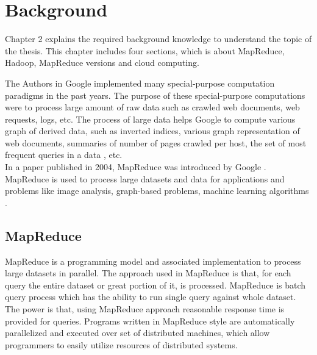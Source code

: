 
\chapter{Background} %

\label{Chapter2} %


  Chapter 2 explains the required background knowledge to understand the topic of the thesis. This chapter includes four sections, which is about MapReduce, Hadoop, MapReduce versions and cloud computing. 
   
    The Authors in Google implemented many special-purpose computation paradigms in the past years. The purpose of these special-purpose computations were to process large amount of raw data such as crawled web documents, web requests, logs, etc. The process of large data helps Google to compute various graph of derived data, such as inverted indices, various graph representation of web documents, summaries of number of pages crawled per host, the set of most frequent queries in a data , etc.\cite{mapreduce}\\

In a paper published in 2004, MapReduce was introduced by Google \cite{mapreduce}. MapReduce is used to process large datasets and data for applications and problems like image analysis, graph-based problems, machine learning algorithms \cite{mahout}.



  
  
\section{MapReduce}

MapReduce is a programming model and associated implementation to process large datasets in parallel.  The approach used in MapReduce is that, for each query the entire dataset or great portion of it, is processed. MapReduce is batch query process which has the ability to run single query against whole dataset. The power is that, using MapReduce approach reasonable response time is provided for queries. Programs written in MapReduce style are automatically parallelized and executed over set of distributed machines, which allow programmers to easily utilize resources of distributed systems. \\

